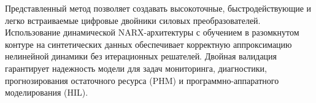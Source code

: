 Представленный метод позволяет создавать высокоточные, быстродействующие и легко встраиваемые цифровые двойники силовых преобразователей. Использование динамической NARX-архитектуры с обучением в разомкнутом контуре на синтетических данных обеспечивает корректную аппроксимацию нелинейной динамики без итерационных решателей. Двойная валидация гарантирует надежность модели для задач мониторинга, диагностики, прогнозирования остаточного ресурса (PHM) и программно-аппаратного моделирования (HIL).
